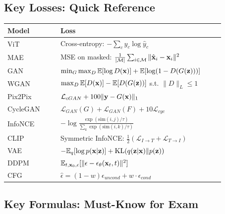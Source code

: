 \subsection{Key Losses: Quick Reference}
\begin{center}\small
\begin{tabular}{p{0.22\linewidth}p{0.68\linewidth}}\toprule
\textbf{Model} & \textbf{Loss} \\\midrule
ViT & Cross-entropy: $-\sum_c y_c\log\hat{y}_c$ \\
MAE & MSE on masked: $\frac{1}{|\mathcal{M}|}\sum_{i\in\mathcal{M}}\|\hat{\mathbf{x}}_i-\mathbf{x}_i\|^2$ \\
GAN & $\min_G\max_D \mathbb{E}[\log D(\mathbf{x})]+\mathbb{E}[\log(1-D(G(\mathbf{z})))]$ \\
WGAN & $\max_D \mathbb{E}[D(\mathbf{x})]-\mathbb{E}[D(G(\mathbf{z}))]$ s.t. $\|D\|_L\leq 1$ \\
Pix2Pix & $\mathcal{L}_{cGAN} + 100\|\mathbf{y}-G(\mathbf{x})\|_1$ \\
CycleGAN & $\mathcal{L}_{GAN}(G)+\mathcal{L}_{GAN}(F)+10\mathcal{L}_{cyc}$ \\
InfoNCE & $-\log\frac{\exp(\text{sim}(i,j)/\tau)}{\sum_k\exp(\text{sim}(i,k)/\tau)}$ \\
CLIP & Symmetric InfoNCE: $\frac{1}{2}(\mathcal{L}_{I\to T}+\mathcal{L}_{T\to I})$ \\
VAE & $-\mathbb{E}_q[\log p(\mathbf{x}|\mathbf{z})]+\text{KL}(q(\mathbf{z}|\mathbf{x})\|p(\mathbf{z}))$ \\
DDPM & $\mathbb{E}_{t,\mathbf{x}_0,\epsilon}[\|\epsilon-\epsilon_\theta(\mathbf{x}_t,t)\|^2]$ \\
CFG & $\hat\epsilon = (1-w)\epsilon_{uncond} + w\cdot\epsilon_{cond}$ \\
\bottomrule
\end{tabular}
\end{center}

\subsection{Key Formulas: Must-Know for Exam}

